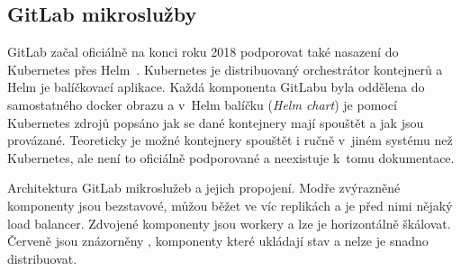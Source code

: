     \subsection{GitLab mikroslužby}
        GitLab začal oficiálně na konci roku 2018 podporovat také nasazení do Kubernetes přes Helm~\cite{gitlab-helm-chart}. Kubernetes je distribuovaný orchestrátor kontejnerů a Helm je balíčkovací aplikace. Každá komponenta GitLabu byla oddělena do samostatného docker obrazu a v~Helm balíčku (\textit{Helm chart}) je pomocí Kubernetes zdrojů popsáno jak se dané kontejnery mají spouštět a jak jsou provázané. Teoreticky je možné kontejnery spouštět i ručně v~jiném systému než Kubernetes, ale není to oficiálně podporované a neexistuje k~tomu dokumentace.

        \begin{iffigure}
            \centering
            \caption{Architektura GitLab mikroslužeb a jejich propojení. Modře zvýrazněné komponenty jsou bezstavové, můžou běžet ve víc replikách a je před nimi nějaký load balancer. Zdvojené komponenty jsou workery a lze je horizontálně škálovat. Červeně jsou znázorněny , komponenty které ukládají stav a nelze je snadno distribuovat.}
            \label{pic:gitlab-architecture}
        \end{iffigure}

